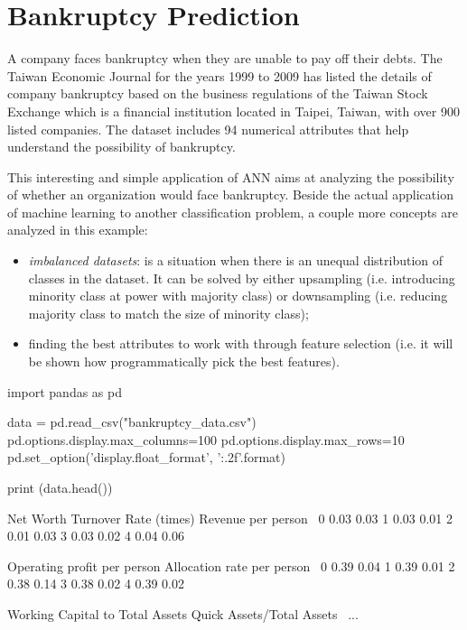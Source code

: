 \section{Bankruptcy Prediction}
A company faces bankruptcy when they are unable to pay off their debts. The Taiwan Economic Journal for the years 1999 to 2009 has listed the details of company bankruptcy based on the business regulations of the Taiwan Stock Exchange which is a financial institution located in Taipei, Taiwan, with over 900 listed companies. The dataset includes 94 numerical attributes that help understand the possibility of bankruptcy.

This interesting and simple application of ANN aims at analyzing the possibility of whether an organization would face bankruptcy. Beside the actual application of machine learning to another classification problem, a couple more concepts are analyzed in this example:
\begin{itemize}
\item \emph{imbalanced datasets}: is a situation when there is an unequal distribution of classes in the dataset. It can be solved by either upsampling (i.e. introducing minority class at power with majority class) or downsampling (i.e. reducing majority class to match the size of minority class);
\item finding the best attributes to work with through feature selection (i.e. it will be shown how programmatically pick the best features).
\end{itemize}

\begin{ipython}
import pandas as pd

data = pd.read_csv("bankruptcy_data.csv")
pd.options.display.max_columns=100
pd.options.display.max_rows=10
pd.set_option('display.float_format', '{:.2f}'.format)

print (data.head())
\end{ipython}
\begin{ioutput}
   Net Worth Turnover Rate (times)  Revenue per person  \
0                             0.03                0.03   
1                             0.03                0.01   
2                             0.01                0.03   
3                             0.03                0.02   
4                             0.04                0.06   

   Operating profit per person  Allocation rate per person  \
0                         0.39                        0.04   
1                         0.39                        0.01   
2                         0.38                        0.14   
3                         0.38                        0.02   
4                         0.39                        0.02   

   Working Capital to Total Assets  Quick Assets/Total Assets  \
...                        
\end{ioutput}

